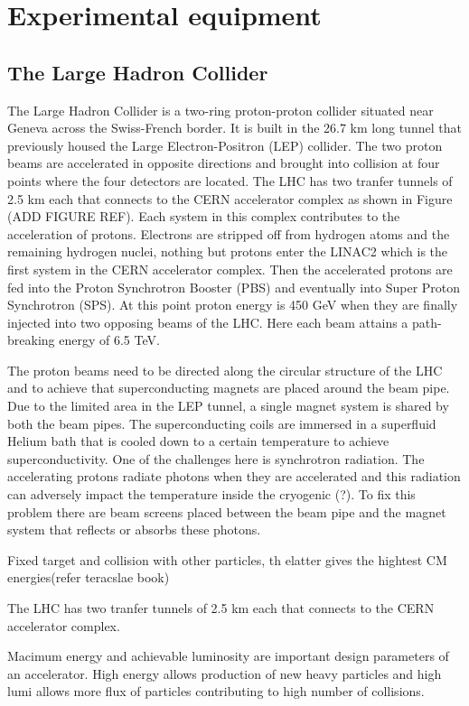 
\chapter{Experimental equipment}
\label{sec:LHCATLAS}

\section{The Large Hadron Collider}
The Large Hadron Collider is a two-ring proton-proton collider situated near Geneva across the Swiss-French border. It is built in the 26.7 km long tunnel 
that previously housed the Large Electron-Positron (LEP) collider. The two proton beams are accelerated in opposite directions and brought into collision at 
four points where the four detectors are located. The LHC has two tranfer tunnels of 2.5 km each that connects to the CERN accelerator complex as shown in 
Figure (ADD FIGURE REF). Each system in this complex contributes to the acceleration of protons. Electrons are stripped off from hydrogen atoms and the remaining hydrogen nuclei, nothing but protons
enter the LINAC2 which is the first system in the CERN accelerator complex. Then the accelerated protons are fed into the Proton Synchrotron Booster (PBS)
and eventually into Super Proton Synchrotron (SPS). At this point proton energy is 450 GeV when they are finally injected into two opposing beams of the
LHC. Here each beam attains a path-breaking energy of 6.5 TeV. 

The proton beams need to be directed along the circular structure of the LHC and to achieve that superconducting magnets are placed around the beam pipe.
Due to the limited area in the LEP tunnel, a single magnet system is shared by both the beam pipes. The superconducting coils are immersed in a superfluid Helium bath that is cooled down to a certain temperature to achieve superconductivity. One of the 
challenges here is synchrotron radiation. The accelerating protons radiate photons when they are accelerated and this radiation can adversely impact the 
temperature inside the cryogenic (?). To fix this problem there are beam screens placed between the beam pipe and the magnet system that reflects or absorbs 
these photons. 



Fixed target and collision with other particles, th elatter gives the hightest CM energies(refer teracslae book)

The LHC has two tranfer tunnels of 2.5 km each that connects to the CERN accelerator complex. 

Macimum energy and achievable luminosity are important design parameters of an accelerator. High energy allows production of new heavy particles and high 
lumi allows more flux of particles contributing to high number of collisions.